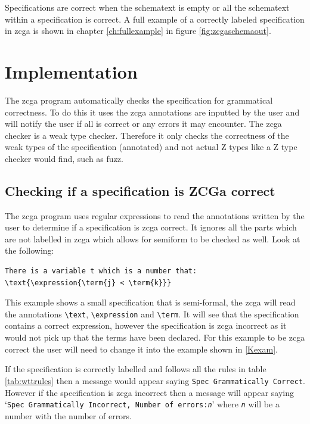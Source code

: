 Specifications are correct when the schematext is empty or all the schematext
within a specification is correct. A full example of a correctly labeled
specification in \gls{zcga} is shown in chapter \ref{ch:fullexample} in figure
\ref{fig:zcgaschemaout}.

\section{Implementation}

The \gls{zcga} program automatically checks the specification for grammatical
correctness. To do this it uses the \gls{zcga} annotations are inputted by the user
and will notify the user if all is correct or any errors it may encounter. The
\gls{zcga} checker is a weak type checker. Therefore it only checks the
correctness of the weak types of the specification (annotated) and not actual Z
types like a Z type checker would find, such as fuzz.

\subsection{Checking if a specification is ZCGa correct}

The \gls{zcga} program uses regular expressions to read the annotations written
by the user to determine if a specification is \gls{zcga} correct. It ignores
all the parts which are not labelled in \gls{zcga} which allows for
\gls{semiform} to be checked as well. Look at the following:

\begin{exam}
\begin{verbatim}
There is a variable t which is a number that:
\text{\expression{\term{j} < \term{k}}}
\end{verbatim}
\end{exam}

This example shows a small specification that is semi-formal, the \gls{zcga}
will read the annotations \verb|\text|, \verb|\expression| and \verb|\term|. It
will see that the specification contains a correct expression, however the
specification is \gls{zcga} incorrect as it would not pick up that the terms
have been declared. For this example to be \gls{zcga} correct the user will need
to change it into the example shown in \ref{Kexam}.

If the specification is correctly labelled and follows all the rules in table
\ref{tab:wttrules} then a message would appear saying \texttt{Spec Grammatically
Correct}. However if the specification is \gls{zcga} incorrect then a message
will appear saying `\texttt{Spec Grammatically Incorrect, Number of
errors:\emph{n}}' where \texttt{\emph{n}} will be a number with the number of
errors.

